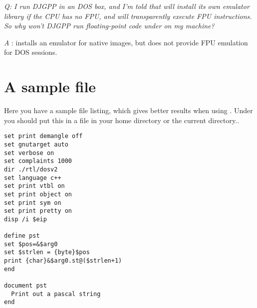 \documentclass{report}
\begin{document}
{\em   Q: I run DJGPP in an \ostwo DOS box, and I'm told that \ostwo will install
   its own emulator library if the CPU has no FPU, and will transparently
   execute FPU instructions. So why won't DJGPP run floating-point code
   under \ostwo on my machine?
}

{\em   A} : \ostwo installs an emulator for native \ostwo images, but does not
   provide FPU emulation for DOS sessions.


\chapter{A sample  file}
\label{ch:GdbIniFile}

Here you have a sample  file listing, which gives better
results when using . Under \linux you should put this in a
 file in your home directory or the current directory..

\begin{verbatim}
set print demangle off
set gnutarget auto
set verbose on
set complaints 1000
dir ./rtl/dosv2
set language c++
set print vtbl on
set print object on
set print sym on
set print pretty on
disp /i $eip

define pst
set $pos=&$arg0
set $strlen = {byte}$pos
print {char}&$arg0.st@($strlen+1)
end

document pst
  Print out a pascal string
end
\end{verbatim}
\end{document}
